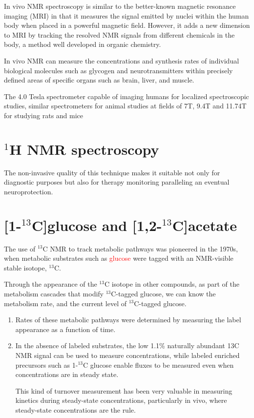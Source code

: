 In vivo NMR spectroscopy is similar to the better-known magnetic resonance
imaging (MRI) in that it measures the signal emitted by nuclei within the human
body when placed in a powerful magnetic field.
However, it adds a new dimension to MRI by tracking the resolved NMR signals
from different chemicals in the body, a method well developed in organic
chemistry.

In vivo NMR can measure the concentrations and synthesis rates of individual
biological molecules such as glycogen and neurotransmitters within precisely
defined areas of specific organs such as brain, liver, and muscle.


The 4.0 Tesla spectrometer capable of imaging humans for localized spectroscopic
 studies, similar spectrometers for animal studies at fields of 7T, 9.4T and
 11.74T for studying rats and mice
 

\section{$^{1}$H NMR spectroscopy}
\label{sec:NMR-1H}

The non-invasive quality of this technique makes it suitable not only for
diagnostic purposes but also for therapy monitoring paralleling an eventual
neuroprotection.


\section{[1-$^{13}$C]glucose and [1,2-$^{13}$C]acetate}
\label{sec:NMR-13C}

The use of $^{13}$C NMR to track metabolic pathways was pioneered in the 1970s,
when metabolic substrates such as \textcolor{red}{glucose} were tagged with an
NMR-visible stable isotope, $^{13}$C.

Through the appearance of the $^{13}$C isotope in other compounds, as part of
the metabolism cascades that modify $^{13}$C-tagged glucose, we can know 
the metabolism rate, and the current level of $^{13}$C-tagged glucose.

\begin{enumerate}
  
  \item  Rates of these metabolic pathways were determined by measuring the label appearance as a function of time.
  
  \item In the absence of labeled substrates, the low 1.1\% naturally abundant
  13C NMR signal can be used to measure concentrations, while labeled enriched
  precursors such as 1-$^{13}$C glucose enable fluxes to be measured even when
  concentrations are in steady state.
  
  This kind of turnover measurement has been very valuable in measuring kinetics
  during steady-state concentrations, particularly in vivo, where steady-state
  concentrations are the rule.
  
\end{enumerate}

